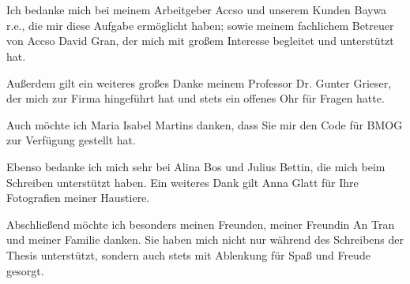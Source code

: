 \vspace*{\fill}




\begingroup
\let\clearpage\relax
\let\cleardoublepage\relax
\let\cleardoublepage\relax
\chapter*{}
Ich bedanke mich bei meinem Arbeitgeber Accso und unserem Kunden Baywa r.e., die mir diese Aufgabe ermöglicht haben; sowie meinem fachlichem Betreuer von Accso David Gran, der mich mit großem Interesse begleitet und unterstützt hat.

\bigskip
Außerdem gilt ein weiteres großes Danke meinem Professor Dr. Gunter Grieser, der mich zur Firma hingeführt hat und stets ein offenes Ohr für Fragen hatte.

\bigskip
Auch möchte ich Maria Isabel Martins danken, dass Sie mir den Code für BMOG zur Verfügung gestellt hat.

\bigskip
Ebenso bedanke ich mich sehr bei Alina Bos und Julius Bettin, die mich beim Schreiben unterstützt haben.
Ein weiteres Dank gilt Anna Glatt für Ihre Fotografien meiner Haustiere.

\bigskip
Abschließend möchte ich besonders meinen Freunden, meiner Freundin An Tran und meiner Familie danken.
Sie haben mich nicht nur während des Schreibens der Thesis unterstützt, sondern auch stets mit Ablenkung für Spaß und Freude gesorgt.
\endgroup
\vspace*{\fill}